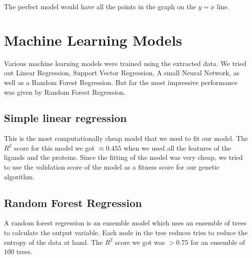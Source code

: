 \documentclass[11pt]{article}
\begin{document}
The perfect model would have all the points in the graph on the $y = x$ line.

\section{Machine Learning Models}

Various machine learning models were trained using the extracted data.
We tried out Linear Regression,
Support Vector Regression,
A small Neural Network,
as well as a Random Forest Regression.
But far the most impressive performance was given by Random Forest Regression.

\subsection{Simple linear regression}
This is the most computationally cheap model that we used to fit our model.
The $R^2$ score for this model we got $\approx 0.455$ when we used all the
features of the ligands and the proteins.
Since the fitting of the model was very cheap, we tried to use the validation
score of the model as a fitness score for our genetic algorithm.


\subsection{Random Forest Regression}
A random forest regression is an ensemble model which uses an ensemble of trees
to calculate the output variable.
Each node in the tree reduces tries to reduce the entropy of the data at hand.
The $R^2$ score we got was $> 0.75$ for an ensemble of $100$ trees.
\end{document}
